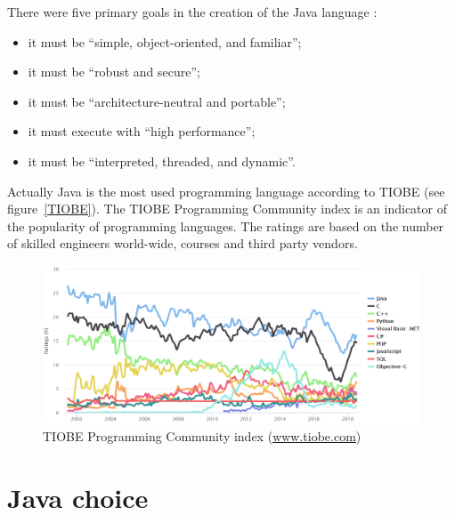 There were five primary goals in the creation of the Java language \cite{java}:
\begin{itemize}
\item it must be ``simple, object-oriented, and familiar'';
\item it must be ``robust and secure'';
\item it must be ``architecture-neutral and portable'';
\item it must execute with ``high performance'';
\item it must be ``interpreted, threaded, and dynamic''.
\end{itemize}

Actually Java is the most used programming language according to TIOBE (see figure~\vref{TIOBE}). The TIOBE Programming Community index is an indicator of the popularity of programming languages. The ratings are based on the number of skilled engineers world-wide, courses and third party vendors.

\begin{figure}[htbp]
\centering
\includegraphics[width=\textwidth]{Immagini/Capitolo1/1_5-TrendTIOBE} 
\caption{TIOBE Programming Community index (\href{www.tiobe.com}{www.tiobe.com})}
\label{TIOBE}
\end{figure}

\section{Java choice}
\label{sec1.3}

